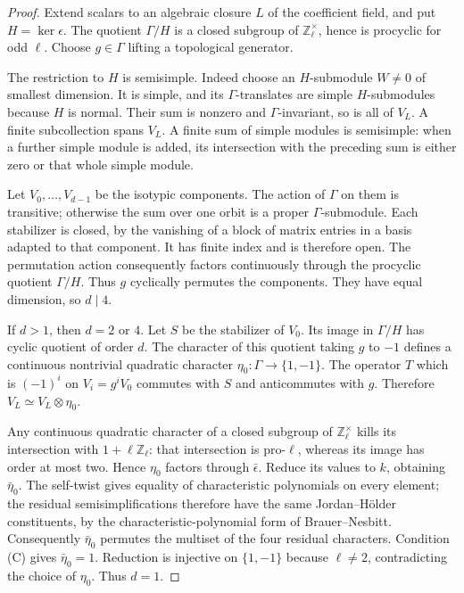 \begin{proof}
Extend scalars to an algebraic closure \(L\) of the coefficient
field, and put \(H=\ker\epsilon\).
The quotient \(\Gamma/H\) is a closed subgroup of
\(\mathbb Z_\ell^\times\), hence is procyclic for odd \(\ell\).
Choose \(g\in\Gamma\) lifting a topological generator.

The restriction to \(H\) is semisimple.
Indeed choose an \(H\)-submodule \(W\ne0\) of smallest dimension.
It is simple, and its \(\Gamma\)-translates are simple \(H\)-submodules
because \(H\) is normal. Their sum is nonzero and
\(\Gamma\)-invariant, so is all of \(V_L\).
A finite subcollection spans \(V_L\).
A finite sum of simple modules is semisimple: when a further simple
module is added, its intersection with the preceding sum is either
zero or that whole simple module.

Let \(V_0,\ldots,V_{d-1}\) be the isotypic components.
The action of \(\Gamma\) on them is transitive; otherwise the sum
over one orbit is a proper \(\Gamma\)-submodule.
Each stabilizer is closed, by the vanishing of a block of matrix
entries in a basis adapted to that component.
It has finite index and is therefore open.
The permutation action consequently factors continuously through
the procyclic quotient \(\Gamma/H\).
Thus \(g\) cyclically permutes the components.
They have equal dimension, so \(d\mid4\).

If \(d>1\), then \(d=2\) or \(4\).
Let \(S\) be the stabilizer of \(V_0\). Its image in
\(\Gamma/H\) has cyclic quotient of order \(d\).
The character of this quotient taking \(g\) to \(-1\) defines a
continuous nontrivial quadratic character
\(\eta_0:\Gamma\to\{1,-1\}\).
The operator \(T\) which is \((-1)^i\) on \(V_i=g^iV_0\)
commutes with \(S\) and anticommutes with \(g\).
Therefore \(V_L\simeq V_L\otimes\eta_0\).

Any continuous quadratic character of a closed subgroup of
\(\mathbb Z_\ell^\times\) kills its intersection with
\(1+\ell\mathbb Z_\ell\): that intersection is pro-\(\ell\),
whereas its image has order at most two.
Hence \(\eta_0\) factors through \(\bar\epsilon\).
Reduce its values to \(k\), obtaining \(\bar\eta_0\).
The self-twist gives equality of characteristic polynomials on
every element; the residual semisimplifications therefore have
the same Jordan--Hölder constituents, by the characteristic-polynomial
form of Brauer--Nesbitt. Consequently \(\bar\eta_0\) permutes the
multiset of the four residual characters.
Condition (C) gives \(\bar\eta_0=1\).
Reduction is injective on \(\{1,-1\}\) because \(\ell\ne2\),
contradicting the choice of \(\eta_0\).
Thus \(d=1\).


\end{proof}
